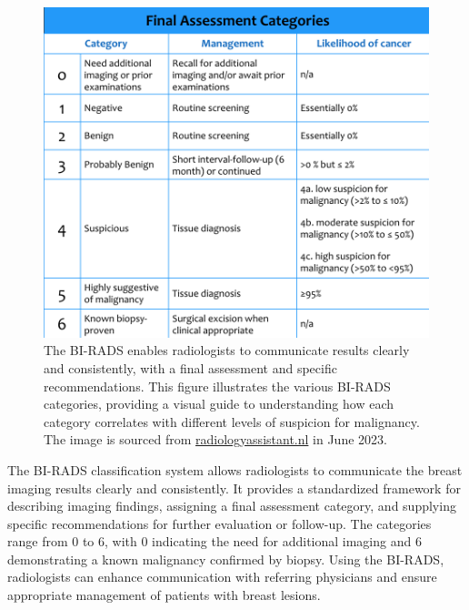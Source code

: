 \begin{figure}[ht]
\centering
\includegraphics[width=\columnwidth]{images/fig020}
\caption{The BI-RADS enables radiologists to communicate results clearly and consistently, with a final assessment and specific recommendations. This figure illustrates the various BI-RADS categories, providing a visual guide to understanding how each category correlates with different levels of suspicion for malignancy. The image is sourced from \protect\href{https://radiologyassistant.nl/breast/bi-rads/bi-rads-for-mammography-and-ultrasound-2013}{radiologyassistant.nl} in June 2023.}
\label{fig:fig020}
\end{figure}

The \ac{BI-RADS} classification system allows radiologists to communicate the breast imaging results clearly and consistently.
It provides a standardized framework for describing imaging findings, assigning a final assessment category, and supplying specific recommendations for further evaluation or follow-up.
The categories range from 0 to 6, with 0 indicating the need for additional imaging and 6 demonstrating a known malignancy confirmed by biopsy.
Using the \ac{BI-RADS}, radiologists can enhance communication with referring physicians and ensure appropriate management of patients with breast lesions.

